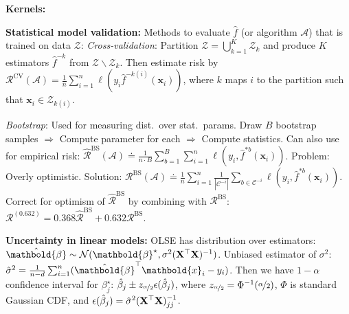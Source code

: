 \documentclass[9pt]{extarticle}
\newenvironment{topic}[1]
{\textbf{\sffamily \colorbox{black}{\rlap{\textbf{\textcolor{white}{#1}}}\hspace{\linewidth}\hspace{-2\fboxsep}}}}
{}
\newenvironment{subtopic}[1]
{\textbf{\sffamily #1:}}
{}
\renewcommand{\mat}[1]{\ensuremath{\mathbf{#1}}}
\renewcommand{\vec}[1]{\ensuremath{\mathbold{#1}}}
\begin{document}
\begin{multicols*}{3}
\begin{topic}{Gaussian processes}
\begin{subtopic}{Kernels}
        \end{subtopic}

    \end{topic}

    \begin{topic}{Uncertainty quantification}
        \begin{subtopic}{Statistical model validation}
            Methods to evaluate $\hat{f}$ (or algorithm $\mathcal{A}$) that is trained on data $\mathcal{Z}$:
            \textit{Cross-validation}: Partition $\mathcal{Z} = \bigcup_{k=1}^K \mathcal{Z}_k$ and produce $K$
            estimators $\hat{f}^{-k}$ from $\mathcal{Z} \backslash \mathcal{Z}_k$. Then estimate risk by
            $\mathcal{R}^{\mathrm{CV}}(\mathcal{A}) = \frac{1}{n} \sum_{i=1}^{n} \ell(y_i
                \hat{f}^{-k(i)}(\vec{x}_i))$, where $k$ maps $i$ to the partition such that $\vec{x}_i \in
                \mathcal{Z}_{k(i)}$.

            \textit{Bootstrap}: Used for measuring dist.\ over stat.\ params. Draw $B$
            bootstrap samples $\Rightarrow$ Compute parameter for each $\Rightarrow$ Compute statistics. Can
            also use for empirical risk: $\hat{\mathcal{R}}^{\mathrm{BS}}(\mathcal{A}) \doteq \frac{1}{n\cdot
                    B} \sum_{b=1}^{B} \sum_{i=1}^{n} \ell(y_i, \hat{f}^{*b}(\vec{x}_i))$. Problem: Overly optimistic.
            Solution: $\mathcal{R}^{\mathrm{BS}}(\mathcal{A}) \doteq \frac{1}{n} \sum_{i=1}^{n}
                \frac{1}{|\mathcal{C}^{-i}|} \sum_{b \in \mathcal{C}^{-i}} \ell(y_i, \hat{f}^{*b}(\vec{x}_i))$.
            Correct for optimism of $\hat{\mathcal{R}}^{\mathrm{BS}}$ by combining with
            $\mathcal{R}^{\mathrm{BS}}$: $\mathcal{R}^{(0.632)} = 0.368 \hat{\mathcal{R}}^{\mathrm{BS}} + 0.632
                \mathcal{R}^{\mathrm{BS}}$.
        \end{subtopic}

        \begin{subtopic}{Uncertainty in linear models}
            OLSE has distribution over estimators: $\hat{\vec{\beta}} \sim \mathcal{N}(\vec{\beta}^\star, \sigma^2 \inv{(\transpose{\mat{X}} \mat{X})})$.
            Unbiased estimator of $\sigma^2$: $\hat{\sigma}^2 = \frac{1}{n-d} \sum_{i=1}^{n}
                (\transpose{\hat{\vec{\beta}}} \vec{x}_i - y_i)$. Then we have $1-\alpha$ confidence interval for
            $\beta_j^\star$: $\hat{\beta}_j \pm z_{\nicefrac{\alpha}{2}} \epsilon(\hat{\beta}_j)$,
            where $z_{\nicefrac{\alpha}{2}} = \Phi^{-1}(\nicefrac{\alpha}{2})$, $\Phi$ is standard Gaussian
            CDF, and $\epsilon(\hat{\beta}_j) = \hat{\sigma}^2 \inv{(\transpose{\mat{X}} \mat{X})}_{jj}$.


\end{subtopic}
\end{topic}
\end{multicols*}
\end{document}
